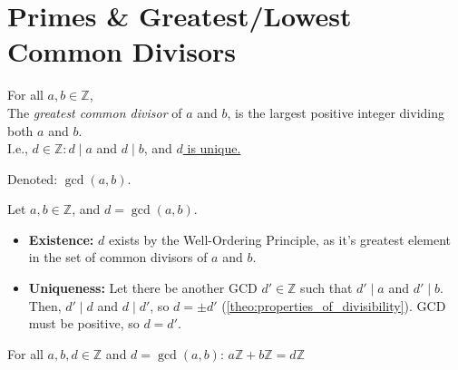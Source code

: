 \newpage
\section{Primes \& Greatest/Lowest Common Divisors}

\begin{Def}

    For all $a,b\in\mathbb{Z}$,\\
    The \textit{greatest common divisor} of $a$ and $b$, is the largest positive integer dividing both $a$ and $b$.\\
    I.e., $d\in\mathbb{Z}: d\mid a$ and $d\mid b$, and \underline{$d$ is unique.}

    \noindent
    Denoted: $\gcd(a,b)$.
\end{Def}

\begin{Proof}

    \label{theo:gcd_existence_uniqueness}

    Let $a,b\in\mathbb{Z}$, and $d=\gcd(a,b)$.\\
    \begin{itemize}
        \item  \textbf{Existence:} $d$ exists by the Well-Ordering Principle, 
        as it's greatest element in the set of common divisors of $a$ and $b$.
        \item \textbf{Uniqueness:} Let there be another GCD $d'\in\mathbb{Z}$ such that $d'\mid a$ and $d'\mid b$.\\
        Then, $d'\mid d$ and $d\mid d'$, so $d=\pm d'$ (\ref{theo:properties_of_divisibility}). GCD must be positive, so $d=d'$.
    \end{itemize}

   

\end{Proof}

\begin{theo}

    \label{theo:gcd_ideal_linear_combination}

    For all \(a, b,d \in \mathbb{Z}\) and $d=\gcd(a,b)$: \(a\mathbb{Z} + b\mathbb{Z} = d\mathbb{Z}\)

\end{theo}

